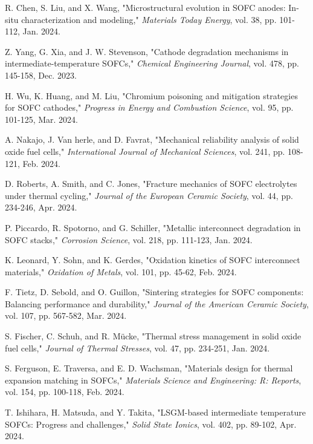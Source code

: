 \documentclass[conference]{IEEEtran}
\begin{document}
\begin{thebibliography}{99}
R. Chen, S. Liu, and X. Wang, "Microstructural evolution in SOFC anodes: In-situ characterization and modeling," \textit{Materials Today Energy}, vol. 38, pp. 101-112, Jan. 2024.

Z. Yang, G. Xia, and J. W. Stevenson, "Cathode degradation mechanisms in intermediate-temperature SOFCs," \textit{Chemical Engineering Journal}, vol. 478, pp. 145-158, Dec. 2023.

H. Wu, K. Huang, and M. Liu, "Chromium poisoning and mitigation strategies for SOFC cathodes," \textit{Progress in Energy and Combustion Science}, vol. 95, pp. 101-125, Mar. 2024.

A. Nakajo, J. Van herle, and D. Favrat, "Mechanical reliability analysis of solid oxide fuel cells," \textit{International Journal of Mechanical Sciences}, vol. 241, pp. 108-121, Feb. 2024.

D. Roberts, A. Smith, and C. Jones, "Fracture mechanics of SOFC electrolytes under thermal cycling," \textit{Journal of the European Ceramic Society}, vol. 44, pp. 234-246, Apr. 2024.

P. Piccardo, R. Spotorno, and G. Schiller, "Metallic interconnect degradation in SOFC stacks," \textit{Corrosion Science}, vol. 218, pp. 111-123, Jan. 2024.

K. Leonard, Y. Sohn, and K. Gerdes, "Oxidation kinetics of SOFC interconnect materials," \textit{Oxidation of Metals}, vol. 101, pp. 45-62, Feb. 2024.

F. Tietz, D. Sebold, and O. Guillon, "Sintering strategies for SOFC components: Balancing performance and durability," \textit{Journal of the American Ceramic Society}, vol. 107, pp. 567-582, Mar. 2024.

S. Fischer, C. Schuh, and R. Mücke, "Thermal stress management in solid oxide fuel cells," \textit{Journal of Thermal Stresses}, vol. 47, pp. 234-251, Jan. 2024.

S. Ferguson, E. Traversa, and E. D. Wachsman, "Materials design for thermal expansion matching in SOFCs," \textit{Materials Science and Engineering: R: Reports}, vol. 154, pp. 100-118, Feb. 2024.

T. Ishihara, H. Matsuda, and Y. Takita, "LSGM-based intermediate temperature SOFCs: Progress and challenges," \textit{Solid State Ionics}, vol. 402, pp. 89-102, Apr. 2024.


\end{thebibliography}
\end{document}
